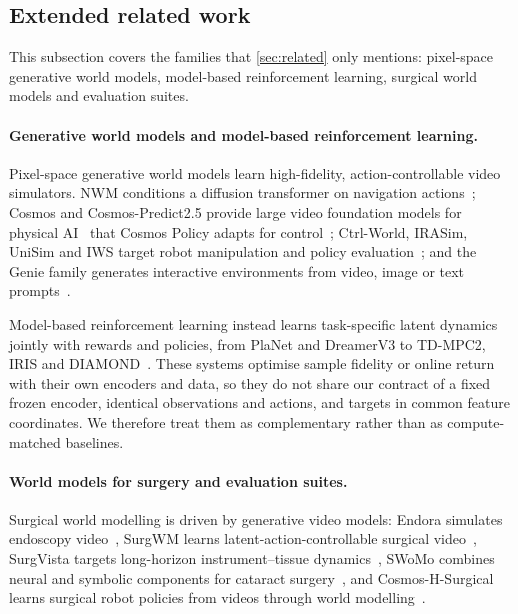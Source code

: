 \FloatBarrier
\subsection{Extended related work}\label{app:related-extended}
This subsection covers the families that \cref{sec:related} only mentions: pixel-space generative world models,
model-based reinforcement learning, surgical world models and evaluation suites.
\paragraph{Generative world models and model-based reinforcement learning.}
Pixel-space generative world models learn high-fidelity, action-controllable video simulators. NWM conditions a diffusion
transformer on navigation actions~\citep{bar2025nwm}; Cosmos and Cosmos-Predict2.5 provide large video foundation models
for physical AI~\citep{nvidia2025cosmos,nvidia2025cosmospredict25} that Cosmos Policy adapts for control~\citep{kim2026cosmospolicy};
Ctrl-World, IRASim, UniSim and IWS target robot manipulation and policy evaluation~\citep{guo2026ctrlworld,zhu2025irasim,yang2024unisim,wang2026iws};
and the Genie family generates interactive environments from video, image or text prompts~\citep{bruce2024genie,parkerholder2025genie3}.

Model-based reinforcement learning instead learns task-specific latent dynamics jointly with rewards and policies, from
PlaNet and DreamerV3 to TD-MPC2, IRIS and DIAMOND~\citep{hafner2019planet,hafner2025dreamerv3,hansen2024tdmpc2,micheli2023iris,alonso2024diamond}.
These systems optimise sample fidelity or online return with their own encoders and data, so they do not share our
contract of a fixed frozen encoder, identical observations and actions, and targets in common feature coordinates. We
therefore treat them as complementary rather than as compute-matched baselines.
\paragraph{World models for surgery and evaluation suites.}
Surgical world modelling is driven by generative video models: Endora simulates endoscopy video~\citep{li2024endora},
SurgWM learns latent-action-controllable surgical video~\citep{koju2025surgwm}, SurgVista targets long-horizon
instrument--tissue dynamics~\citep{pan2026surgvista}, SWoMo combines neural and symbolic components for cataract
surgery~\citep{sivakumar2026swomo}, and Cosmos-H-Surgical learns surgical robot policies from videos through world
modelling~\citep{he2025cosmoshsurgical}.

